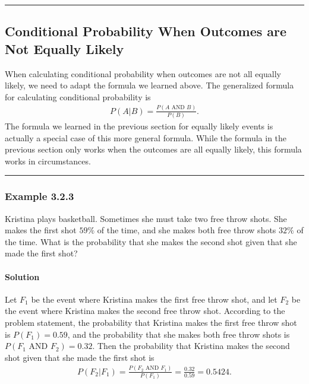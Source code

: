 \documentclass[letterpaper,10pt,english]{jupyterBook}
\begin{document}
\bigskip\hrule\bigskip



\subsection{Conditional Probability When Outcomes are Not Equally Likely}
\label{\detokenize{Ch3 Probability/3.2 Conditional Probability:conditional-probability-when-outcomes-are-not-equally-likely}}
\sphinxAtStartPar
When calculating conditional probability when outcomes are not all equally likely, we need to adapt the formula we learned above. The generalized formula for calculating conditional probability is
\begin{equation*}
\begin{split} P(A|B) = \frac{P(A \text{ AND } B)}{P(B)}. \end{split}
\end{equation*}
\sphinxAtStartPar
The formula we learned in the previous section for equally likely events is actually a special case of this more general formula. While the formula in the previous section only works when the outcomes are all equally likely, this formula works  in  circumstances.


\bigskip\hrule\bigskip



\subsubsection{Example 3.2.3}
\label{\detokenize{Ch3 Probability/3.2 Conditional Probability:example-3-2-3}}
\sphinxAtStartPar
Kristina plays basketball. Sometimes she must take two free throw shots. She makes the first shot \(59\%\) of the time, and she makes both free throw shots \(32\%\) of the time. What is the probability that she makes the second shot given that she made the first shot?


\paragraph{Solution}
\label{\detokenize{Ch3 Probability/3.2 Conditional Probability:id5}}
\sphinxAtStartPar
Let \(F_1\) be the event where Kristina makes the first free throw shot, and let \(F_2\) be the event where Kristina makes the second free throw shot. According to the problem statement, the probability that Kristina makes the first free throw shot is \(P(F_1) = 0.59\), and the probability that she makes both free throw shots is \(P(F_1 \text{ AND } F_2) = 0.32\). Then the probability that Kristina makes the second shot given that she made the first shot is
\begin{equation*}
\begin{split} P(F_2|F_1) = \frac{P(F_2 \text{ AND } F_1)}{P(F_1)} = \frac{0.32}{0.59} = 0.5424. \end{split}
\end{equation*}
\end{document}
